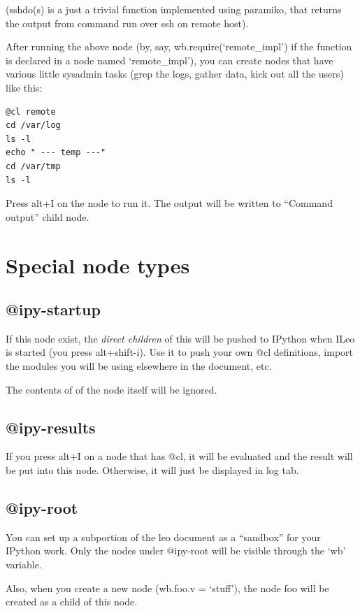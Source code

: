 \documentclass[a4paper,10pt,english]{sphinxmanual}
\begin{document}
(sshdo(s) is a just a trivial function implemented using paramiko, that
returns the output from command run over ssh on remote host).

After running the above node (by, say, wb.require(`remote\_impl') if the function is
declared in a node named `remote\_impl'), you can create nodes that have various
little sysadmin tasks (grep the logs, gather data, kick out all the users) like this:

\begin{Verbatim}[commandchars=\\\{\}]
@cl remote
cd /var/log
ls -l
echo " --- temp ---"
cd /var/tmp
ls -l
\end{Verbatim}

Press alt+I on the node to run it. The output will be written to
``Command output'' child node.


\section{Special node types}
\label{IPythonBridge:special-node-types}

\subsection{@ipy-startup}
\label{IPythonBridge:ipy-startup}
If this node exist, the \emph{direct children} of this will be pushed to IPython when
ILeo is started (you press alt+shift-i). Use it to push your own @cl
definitions, import the modules you will be using elsewhere in the document, etc.

The contents of of the node itself will be ignored.


\subsection{@ipy-results}
\label{IPythonBridge:ipy-results}
If you press alt+I on a node that has @cl, it will be evaluated and the result
will be put into this node. Otherwise, it will just be displayed in log tab.


\subsection{@ipy-root}
\label{IPythonBridge:ipy-root}
You can set up a subportion of the leo document as a ``sandbox'' for your IPython
work. Only the nodes under @ipy-root will be visible through the `wb' variable.

Also, when you create a new node (wb.foo.v = `stuff'), the node foo will be created as
a child of this node.
\end{document}
